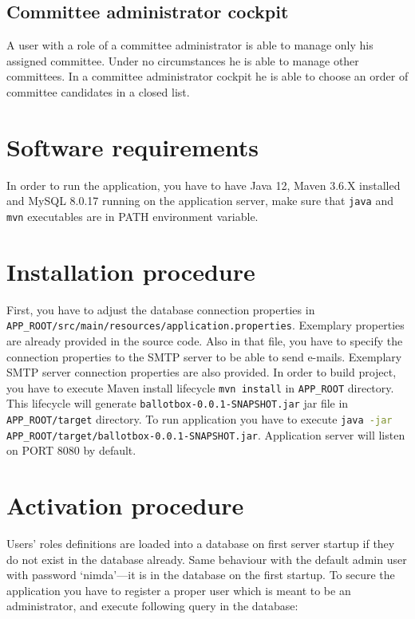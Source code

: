 \documentclass[a4paper,twoside,12pt]{book}
\begin{document}
    \subsection{Committee administrator cockpit}
    A user with a role of a committee administrator is able to manage only his assigned committee. Under no circumstances he is able to manage other committees.
    In a committee administrator cockpit he is able to choose an order of committee candidates in a closed list. 
  
  \section{Software requirements}
    In order to run the application, you have to have Java 12, Maven 3.6.X installed and MySQL 8.0.17 running on the application server, 
    make sure that \lstinline[language=bash]|java| and \lstinline[language=bash]|mvn| executables are in PATH environment variable.

  \section{Installation procedure}
    First, you have to adjust the database connection properties in \lstinline|APP_ROOT/src/main/resources/application.properties|. Exemplary properties are already provided in the source code.
    Also in that file, you have to specify the connection properties to the SMTP server to be able to send e-mails. Exemplary SMTP server connection properties are also provided.
    In order to build project, you have to execute Maven install lifecycle \lstinline[language=bash]|mvn install| in \lstinline|APP_ROOT| directory.
    This lifecycle will generate \lstinline[language=bash]|ballotbox-0.0.1-SNAPSHOT.jar| jar file in \lstinline|APP_ROOT/target| directory.
    To run application you have to execute \lstinline[language=bash]|java -jar APP_ROOT/target/ballotbox-0.0.1-SNAPSHOT.jar|. 
    Application server will listen on PORT 8080 by default. 
    
  \section{Activation procedure}
    Users' roles definitions are loaded into a database on first server startup if they do not exist in the database already.
    Same behaviour with the default admin user with password `nimda'---it is in the database on the first startup.
    To secure the application you have to register a proper user which is meant to be an administrator, and execute  following query in the database:
\end{document}
